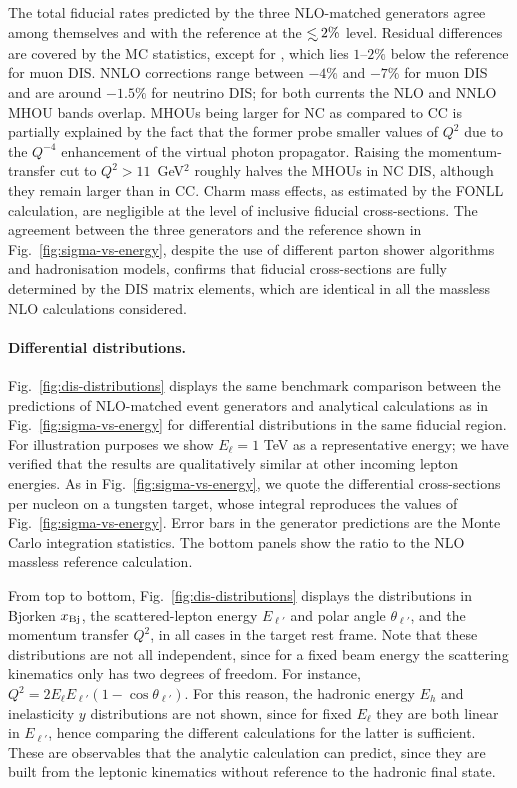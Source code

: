 The total fiducial rates predicted by the three NLO-matched generators agree among themselves and with the \yadism reference at the $\lsim 2\%$ level.
%
Residual differences are covered by the MC statistics, except for \powhegres, which lies $1$--$2\%$ below the reference for muon DIS.
%
NNLO corrections range between $-4\%$ and $-7\%$ for muon DIS and are around $-1.5\%$ for neutrino DIS; for both currents the NLO and NNLO MHOU bands overlap.
%
MHOUs being larger for NC as compared to CC is partially explained by the fact that the former probe smaller values of $Q^2$ due to the $Q^{-4}$ enhancement of the virtual photon propagator. 
%
Raising the momentum-transfer cut to $Q^2 > 11$~GeV$^2$ roughly halves the MHOUs in NC DIS, although they remain larger than in CC.
%
Charm mass effects, as estimated by the \yadism FONLL calculation, are negligible at the level of inclusive fiducial cross-sections. 
%
The agreement between the three generators and the \yadism reference shown in Fig.~\ref{fig:sigma-vs-energy}, despite the use of different parton shower algorithms and hadronisation models, confirms that fiducial cross-sections are fully determined by the DIS matrix elements, which are identical in all the massless NLO calculations considered.

\paragraph{Differential distributions.}
\label{sec:incl-diff}
%
Fig.~\ref{fig:dis-distributions} displays the same benchmark comparison between the predictions of NLO-matched event generators and analytical calculations as in Fig.~\ref{fig:sigma-vs-energy} for differential distributions in the same fiducial region.
%
For illustration purposes we show $E_\ell=1$ TeV as a
representative energy; we have verified that the results are qualitatively similar at other incoming lepton energies.
%
As in Fig.~\ref{fig:sigma-vs-energy}, we quote the differential cross-sections per nucleon on a tungsten target, whose integral reproduces the values of Fig.~\ref{fig:sigma-vs-energy}.
%
Error bars in the generator predictions are the  Monte Carlo integration statistics.
%
The bottom panels show the ratio to the NLO massless \yadism reference calculation.

From top to bottom, Fig.~\ref{fig:dis-distributions} displays the distributions in Bjorken $x_{\rm Bj}$, the scattered-lepton energy $E_{\ell'}$ and polar angle $\theta_{\ell'}$, and the momentum transfer $Q^2$, in all cases in the target rest frame.
%
Note that these distributions are not all independent, since for a fixed beam energy the scattering kinematics only has two degrees of freedom.
%
For instance, $Q^2 = 2 E_\ell E_{\ell'} (1 - \cos\theta_{\ell'})$.
%
For this reason, the hadronic energy $E_h$ and inelasticity $y$ distributions are not shown, since for fixed $E_\ell$ they are both linear in $E_{\ell'}$, hence comparing the different calculations for the latter is sufficient. 
%
These are observables that the  analytic \yadism calculation can predict, since they are built from the leptonic kinematics without reference to the hadronic final state.

